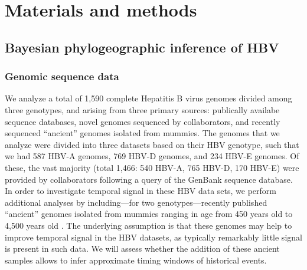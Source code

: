 \chapter{Materials and methods}
\label{ch:methodology}

%

\section{Bayesian phylogeographic inference of HBV}

\subsection{Genomic sequence data}
We analyze a total of 1,590 complete Hepatitis B virus genomes divided among three genotypes, and arising from three primary sources: publically availabe sequence databases, novel genomes sequenced by collaborators, and recently sequenced ``ancient'' genomes isolated from mummies.
The genomes that we analyze were divided into three datasets based on their HBV genotype, such that we had 587 HBV-A genomes, 769 HBV-D genomes, and 234 HBV-E genomes.
Of these, the vast majority (total 1,466: 540 HBV-A, 765 HBV-D, 170 HBV-E) were provided by collaborators following a query of the GenBank sequence database. %
In order to investigate temporal signal in these HBV data sets, we perform additional analyses by including---for two genotypes---recently published ``ancient'' genomes isolated from mummies ranging in age from 450 years old to 4,500 years old \cite{muhlemann2018ancient, ross2018paradox}.
The underlying assumption is that these genomes may help to improve temporal signal in the HBV datasets, as typically remarkably little signal is present in such data.
We will assess whether the addition of these ancient samples allows to infer approximate timing windows of historical events.

